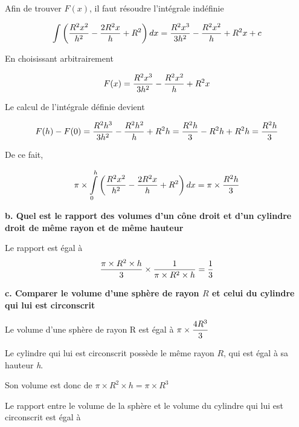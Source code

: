 \documentclass[10pt]{article}
\begin{document}
Afin de trouver $F(x)$, il faut résoudre l'intégrale indéfinie\vspace{0.2cm}

$$\int\left({R^2x^2\over{h^2}}-{2R^2x\over{h}}+R^2\right)dx={R^2x^3\over{3}h^2}-{R^2x^2\over{h}}+R^2x+c$$\vspace{0.01cm}

En choisissant arbitrairement

$$F(x)={R^2x^3\over{3}h^2}-{R^2x^2\over{h}}+R^2x$$\vspace{0.01cm}

Le calcul de l'intégrale définie devient\vspace{0.2cm}

$$F(h)-F(0)={R^2h^3\over{3}h^2}-{R^2h^2\over{h}}+R^2h={R^2h\over{3}}-R^2h+R^2h={R^2h\over{3}}$$\vspace{0.01cm}

De ce fait,

$$\pi\times\int\limits_0^h\left({R^2x^2\over{h^2}}-{2R^2x\over{h}}+R^2\right)dx=\pi\times{R^2h\over{3}}$$


\newpage
\flushleft \textbf{b. Quel est le rapport des volumes d'un cône droit et d'un cylindre droit de même rayon et de même hauteur}\vspace{0.5cm}

Le rapport est égal à $$\displaystyle{\pi \times R^2 \times h \over{3}} \times {1\over{\pi \times R^2 \times h}}={1\over{3}}$$

\flushleft \textbf{c. Comparer le volume d'une sphère de rayon $R$ et celui du cylindre qui lui est circonscrit}\vspace{0.5cm}

Le volume d'une sphère de rayon R est égal à $\displaystyle\pi\times{4R^3\over{3}}$\vspace{0.5cm}

Le cylindre qui lui est circonscrit possède le même rayon $R$, qui est égal à sa hauteur \textit{h}.\vspace{0.5cm}

Son volume est donc de $\pi \times R^2 \times h=\pi \times R^3$ \vspace{0.5cm}

Le rapport entre le volume de la sphère et le volume du cylindre qui lui est circonscrit est égal à
\end{document}
